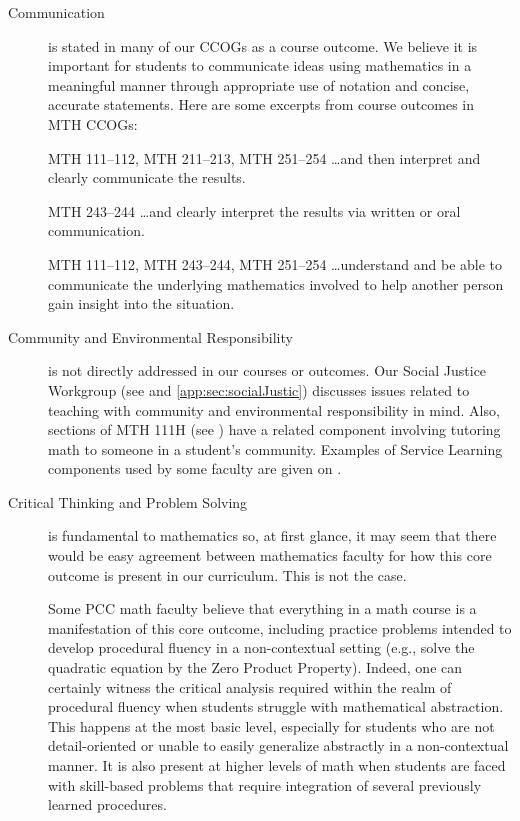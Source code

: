\begin{description}
	\item[Communication] is stated in many of our CCOGs as a course outcome. We
	believe it is important for students to communicate ideas using mathematics in
	a meaningful manner through appropriate use of notation and concise, accurate
	statements.  Here are some excerpts from course outcomes in MTH CCOGs:
	\begin{aquote}{MTH 111--112, MTH 211--213, MTH 251--254}
		{\ldots}and then interpret and clearly communicate the results.
	\end{aquote}

	\begin{aquote}{MTH 243--244}
		{\ldots}and clearly interpret the results via written or oral communication.
	\end{aquote}

	\begin{aquote}{MTH 111--112, MTH 243--244, MTH 251--254}
		{\ldots}understand and be able to communicate the underlying mathematics
		involved to help another person gain insight into the situation.
	\end{aquote}

	\item[Community and Environmental Responsibility] is not directly addressed in
	our courses or outcomes. Our Social Justice Workgroup
	(see  and \vref{app:sec:socialJustic}) discusses issues
	related to teaching with community and environmental responsibility in mind.
	Also, sections of MTH 111H (see ) have a related component
	involving tutoring math to someone in a student's community. Examples of
	Service Learning components used by some faculty are given on .

	\item[Critical Thinking and Problem Solving]
	is fundamental to mathematics so, at first glance, it may seem that there would
	be easy agreement between mathematics faculty for how this core outcome is
	present in our curriculum. This is not the case.

	Some PCC math faculty believe that everything in a math course is a
	manifestation of this core outcome, including practice problems intended to
	develop procedural fluency in a non-contextual setting (e.g., solve the quadratic
	equation by the Zero Product Property). Indeed, one can certainly witness the
	critical analysis required within the realm of procedural fluency when students
	struggle with  mathematical abstraction. This happens at the most basic level,
	especially for students who are not detail-oriented or unable to easily
	generalize abstractly in a non-contextual manner. It is also present at higher
	levels of math when students are faced with skill-based problems that require
	integration of several previously learned procedures.


\end{description}

